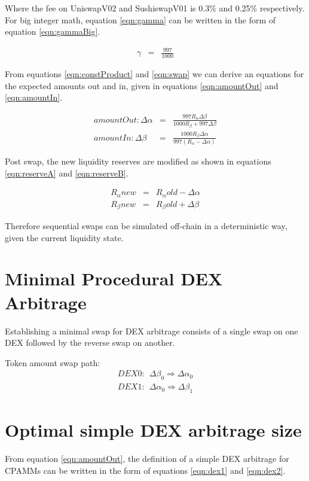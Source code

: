 \documentclass[runningheads]{llncs}
\begin{document}
	Where the fee on UniswapV02 and SushiswapV01 is 0.3\% and 0.25\% respectively. For big integer math, equation \ref{eqn:gamma} can be written in the form of equation \ref{eqn:gammaBig}.
	
	\begin{eqnarray}
		\gamma  &=& \frac{997}{1000} \label{eqn:gammaBig}
	\end{eqnarray}
	
	From equations \ref{eqn:constProduct} and \ref{eqn:swap} we can derive an equations for the expected amounts out and in, given in equations \ref{eqn:amountOut} and \ref{eqn:amountIn}. 
	
	\begin{eqnarray}
		amountOut: \Delta\alpha  &=& \frac{997 R_{\alpha} \Delta\beta }{1000 R_{\beta} + 997 \Delta\beta} \label{eqn:amountOut}\\
		amountIn: \Delta\beta  &=& \frac{1000 R_{\beta} \Delta\alpha }{997 (R_{\alpha} - \Delta\alpha)} \label{eqn:amountIn}
	\end{eqnarray}
	
	Post swap, the new liquidity reserves are modified as shown in equations \ref{eqn:reserveA} and \ref{eqn:reserveB}.
	
	\begin{eqnarray}
		R_{\alpha}{new}  &=& R_{\alpha}{old} - \Delta\alpha  \label{eqn:reserveA}\\
		R_{\beta}{new}  &=& R_{\beta}{old} + \Delta\beta  \label{eqn:reserveB}
	\end{eqnarray}
	
	Therefore sequential swaps can be simulated off-chain in a deterministic way, given the current liquidity state.
	
	\section{Minimal Procedural DEX Arbitrage}
	Establishing a minimal swap for DEX arbitrage consists of a single swap on one DEX followed by the reverse swap on another.
	
	Token amount swap path:
	\begin{eqnarray}
		DEX0: \: \: \Delta\beta_{0} \Rightarrow \Delta\alpha_{0}\\
		DEX1: \: \: \Delta\alpha_{0} \Rightarrow \Delta\beta_{1}
	\end{eqnarray}
	
	\section{Optimal simple DEX arbitrage size}
	From equation \ref{eqn:amountOut}, the definition of a simple DEX arbitrage for CPAMMs can be written in the form of equations \ref{eqn:dex1} and \ref{eqn:dex2}.
	
\end{document}
